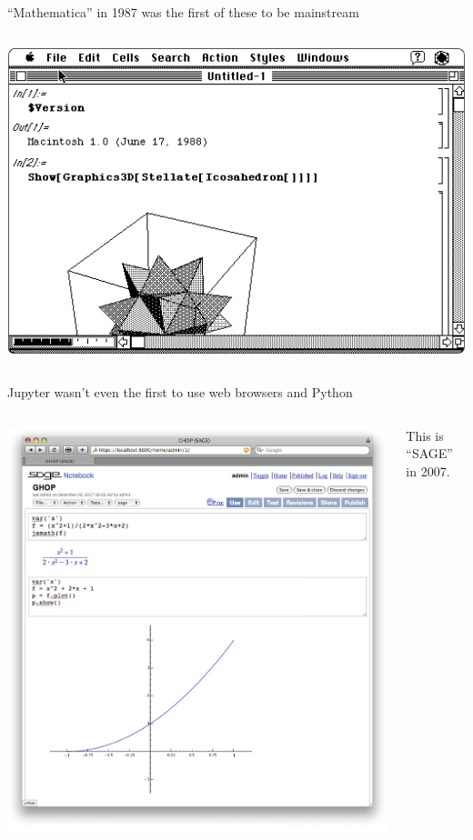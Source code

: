 \documentclass[aspectratio=169]{beamer}
\begin{document}
\begin{frame}{``Mathematica'' in 1987 was the first of these to be mainstream}
\vspace{0.2 cm}
\begin{columns}
\includegraphics[width=\linewidth]{../img/screenshot-1987-mathematica.png}
\end{columns}
\end{frame}

\begin{frame}{Jupyter wasn't even the first to use web browsers and Python}
\vspace{0.2 cm}
\begin{columns}
\includegraphics[width=\linewidth]{../img/screenshot-2007-sage.png}

\Large
This is ``SAGE'' in 2007.
\end{columns}
\end{frame}
\end{document}

